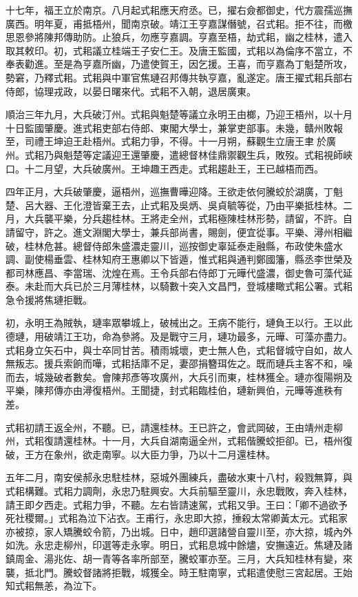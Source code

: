 \begin{pinyinscope}
十七年，福王立於南京。八月起式耜應天府丞。已，擢右僉都御史，代方震孺巡撫廣西。明年夏，甫抵梧州，聞南京破。靖江王亨嘉謀僭號，召式耜。拒不往，而檄思恩參將陳邦傳助防。止狼兵，勿應亨嘉調。亨嘉至梧，劫式耜，幽之桂林，遣入取其敕印。初，式耜議立桂端王子安仁王。及唐王監國，式耜以為倫序不當立，不奉表勸進。至是為亨嘉所幽，乃遣使賀王，因乞援。王喜，而亨嘉為丁魁楚所攻，勢窘，乃釋式耜。式耜與中軍官焦璉召邦傳共執亨嘉，亂遂定。唐王擢式耜兵部右侍郎，協理戎政，以晏日曙來代。式耜不入朝，退居廣東。

順治三年九月，大兵破汀州。式耜與魁楚等議立永明王由榔，乃迎王梧州，以十月十日監國肇慶。進式耜吏部右侍郎、東閣大學士，兼掌吏部事。未幾，贛州敗報至，司禮王坤迫王赴梧州。式耜力爭，不得。十一月朔，蘇觀生立唐王聿於廣州。式耜乃與魁楚等定議迎王還肇慶，遣總督林佳鼎禦觀生兵，敗歿。式耜視師峽口。十二月望，大兵破廣州。王坤趣王西走。式耜趨赴王，王已越梧而西。

四年正月，大兵破肇慶，逼梧州，巡撫曹曄迎降。王欲走依何騰蛟於湖廣，丁魁楚、呂大器、王化澄皆棄王去，止式耜及吳炳、吳貞毓等從，乃由平樂抵桂林。二月，大兵襲平樂，分兵趨桂林。王將走全州，式耜極陳桂林形勢，請留，不許。自請留守，許之。進文淵閣大學士，兼兵部尚書，賜劍，便宜從事。平樂、潯州相繼破，桂林危甚。總督侍郎朱盛濃走靈川，巡按御史辜延泰走融縣，布政使朱盛水調、副使楊垂雲、桂林知府王惠卿以下皆遁，惟式耜與通判鄭國籓，縣丞李世榮及都司林應昌、李當瑞、沈煌在焉。王令兵部右侍郎丁元曄代盛濃，御史魯可藻代延泰。未赴而大兵已於三月薄桂林，以騎數十突入文昌門，登城樓瞰式耜公署。式耜急令援將焦璉拒戰。

初，永明王為賊執，璉率眾攀城上，破械出之。王病不能行，璉負王以行。王以此德璉，用破靖江王功，命為參將。及是戰守三月，璉功最多，元曄、可藻亦盡力。式耜身立矢石中，與士卒同甘苦。積雨城壞，吏士無人色，式耜督城守自如，故人無叛志。援兵索餉而嘩，式耜括庫不足，妻邵捐簪珥佐之。既而璉兵主客不和，噪而去，城幾破者數矣。會陳邦彥等攻廣州，大兵引而東，桂林獲全。璉亦復陽朔及平樂，陳邦傳亦由潯復梧州。王聞捷，封式耜臨桂伯，璉新興伯，元曄等進秩有差。

式耜初請王返全州，不聽。已，請還桂林。王已許之，會武岡破，王由靖州走柳州，式耜復請還桂林。十一月，大兵自湖南逼全州，式耜偕騰蛟拒卻。已，梧州復破，王方在象州，欲走南寧。以大臣力爭，乃以十二月還桂林。

五年二月，南安侯郝永忠駐桂林，惡城外團練兵，盡破水東十八村，殺戮無算，與式耜構難。式耜力調劑，永忠乃駐興安。大兵前驅至靈川，永忠戰敗，奔入桂林，請王即夕西走。式耜力爭，不聽。左右皆請速駕，式耜又爭。王曰：「卿不過欲予死社稷爾。」式耜為泣下沾衣。王甫行，永忠即大掠，捶殺太常卿黃太元。式耜家亦被掠，家人矯騰蛟令箭，乃出城。日中，趙印選諸營自靈川至，亦大掠，城內外如洗。永忠走柳州，印選等走永寧。明日，式耜息城中餘燼，安撫遠近。焦璉及諸鎮周金、湯兆佐、胡一青等各率所部至，騰蛟軍亦至。三月，大兵知桂林有變，來襲，抵北門。騰蛟督諸將拒戰，城獲全。時王駐南寧，式耜遣使慰三宮起居。王始知式耜無恙，為泣下。


\end{pinyinscope}
